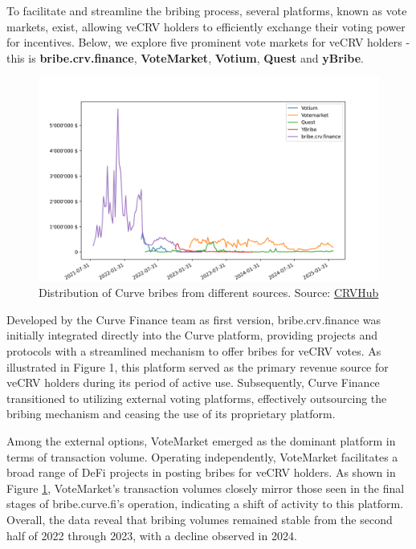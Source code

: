 \documentclass[notitlepage]{revtex4-2}
\begin{document}
To facilitate and streamline the bribing process, several platforms, known as vote markets, exist, allowing
veCRV holders to efficiently exchange their voting power for incentives. Below, we explore five prominent vote markets
for veCRV holders - this is \textbf{bribe.crv.finance}, \textbf{VoteMarket}, \textbf{Votium}, \textbf{Quest} and
\textbf{yBribe}.

\begin{figure}[ht]
    \centering
    \includegraphics[width=\linewidth]{images/CRV_bribes_comparison}
    \caption{Distribution of Curve bribes from different sources. Source: \href{https://crvhub.com}{CRVHub}}
    \label{fig:bribes_distribution}
\end{figure}

Developed by the Curve Finance team as first version, bribe.crv.finance was initially integrated directly into
the Curve platform, providing projects and protocols with a streamlined mechanism to offer bribes for veCRV votes.
As illustrated in Figure 1, this platform served as the primary revenue source for veCRV holders during its period
of active use. Subsequently, Curve Finance transitioned to utilizing external voting platforms, effectively outsourcing
the bribing mechanism and ceasing the use of its proprietary platform.

Among the external options, VoteMarket emerged as the dominant platform in terms of transaction volume. Operating
independently, VoteMarket facilitates a broad range of DeFi projects in posting bribes for veCRV holders. As shown in
Figure \ref{fig:bribes_distribution}, VoteMarket’s transaction volumes closely mirror those seen in the final stages of
bribe.curve.fi’s operation, indicating a shift of activity to this platform. Overall, the data reveal that bribing
volumes remained stable from the second half of 2022 through 2023, with a decline observed in 2024.
\end{document}
